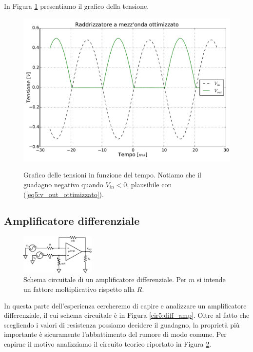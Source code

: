 In Figura \ref{gr5:secondo_raddrizzatore} presentiamo il grafico della tensione.

\begin{figure}[H]
 \centering
   {\includegraphics[width=11.5cm]{../E05/latex/radd_ott.pdf}}
 \caption{Grafico delle tensioni in funzione del tempo. Notiamo che il guadagno negativo quando $V_{in}<0$, plausibile con (\ref{eq5:v_out_ottimizzato}).}
 \label{gr5:secondo_raddrizzatore}
\end{figure}

\subsection{Amplificatore differenziale}

\begin{figure}
  \begin{center}
    \includegraphics[width=0.33\textwidth]{../E05/latex/c_teo_diff_amp.pdf}
  \end{center}
  \caption{Schema circuitale di un amplificatore differenziale. Per $m$ si intende un fattore moltiplicativo rispetto alla $R$.}
  \label{cir5:diff_amp_teo}
\end{figure}

In questa parte dell'esperienza cercheremo di capire e analizzare un amplificatore differenziale, il cui schema circuitale è in Figura \ref{cir5:diff_amp}. Oltre al fatto che scegliendo i valori di resistenza possiamo decidere il guadagno, la proprietà più importante è sicuramente l'abbattimento del rumore di modo comune. Per capirne il motivo analizziamo il circuito teorico riportato in Figura \ref{cir5:diff_amp_teo}.

